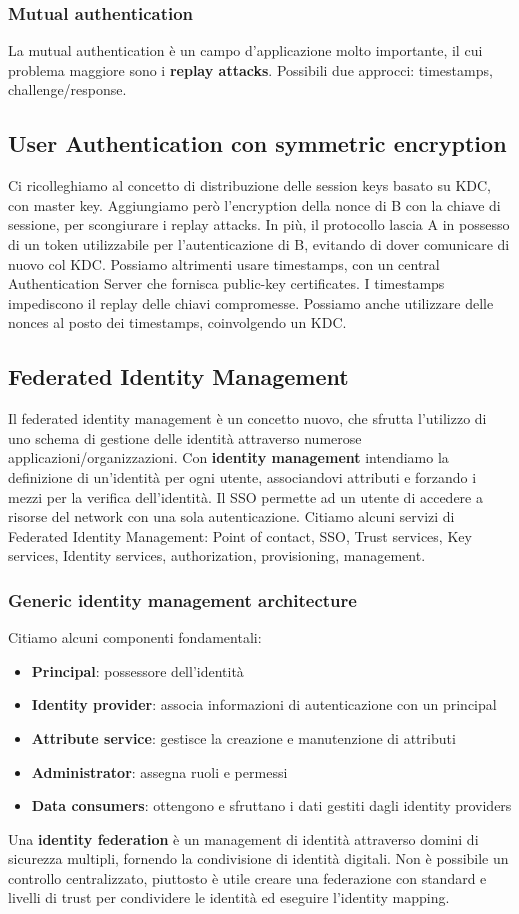 \documentclass[11pt]{article}
\begin{document}
\subsubsection{Mutual authentication}
La mutual authentication è un campo d'applicazione molto importante, il cui problema maggiore sono i \textbf{replay attacks}. Possibili due approcci: timestamps, challenge/response.
\subsection{User Authentication con symmetric encryption}
Ci ricolleghiamo al concetto di distribuzione delle session keys basato su KDC, con master key. Aggiungiamo però l'encryption della nonce di B con la chiave di sessione, per scongiurare i replay attacks. In più, il protocollo lascia A in possesso di un token utilizzabile per l'autenticazione di B, evitando di dover comunicare di nuovo col KDC. Possiamo altrimenti usare timestamps, con un central Authentication Server che fornisca public-key certificates. I timestamps impediscono il replay delle chiavi compromesse. Possiamo anche utilizzare delle nonces al posto dei timestamps, coinvolgendo un KDC. 
\subsection{Federated Identity Management}
Il federated identity management è un concetto nuovo, che sfrutta l'utilizzo di uno schema di gestione delle identità attraverso numerose applicazioni/organizzazioni. Con \textbf{identity management} intendiamo la definizione di un'identità per ogni utente, associandovi attributi e forzando i mezzi per la verifica dell'identità. Il SSO permette ad un utente di accedere a risorse del network con una sola autenticazione. Citiamo alcuni servizi di Federated Identity Management: Point of contact, SSO, Trust services, Key services, Identity services, authorization, provisioning, management. 
\subsubsection{Generic identity management architecture}
Citiamo alcuni componenti fondamentali:
\begin{itemize}
    \item \textbf{Principal}: possessore dell'identità
    \item \textbf{Identity provider}: associa informazioni di autenticazione con un principal
    \item \textbf{Attribute service}: gestisce la creazione e manutenzione di attributi 
    \item \textbf{Administrator}: assegna ruoli e permessi
    \item \textbf{Data consumers}: ottengono e sfruttano i dati gestiti dagli identity providers
\end{itemize}
Una \textbf{identity federation} è un management di identità attraverso domini di sicurezza multipli, fornendo la condivisione di identità digitali. Non è possibile un controllo centralizzato, piuttosto è utile creare una federazione con standard e livelli di trust per condividere le identità ed eseguire l'identity mapping. 
\end{document}
